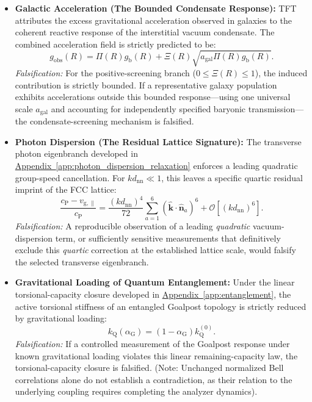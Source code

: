 \begin{itemize}
    \item \textbf{Galactic Acceleration (The Bounded Condensate Response):} TFT attributes the excess gravitational acceleration observed in galaxies to the coherent reactive response of the interstitial vacuum condensate. The combined acceleration field is strictly predicted to be:
    \begin{equation}
        g_{\mathrm{obs}}(R) = \Pi(R)g_{\mathrm b}(R) + \Xi(R) \sqrt{ a_{\mathrm{gal}}\Pi(R)g_{\mathrm b}(R) }.
    \end{equation}
    \textit{Falsification:} For the positive-screening branch ($0\leq\Xi(R)\leq1$), the induced contribution is strictly bounded. If a representative galaxy population exhibits accelerations outside this bounded response—using one universal scale $a_{\mathrm{gal}}$ and accounting for independently specified baryonic transmission—the condensate-screening mechanism is falsified.

    \item \textbf{Photon Dispersion (The Residual Lattice Signature):} The transverse photon eigenbranch developed in \hyperref[app:photon_dispersion_relaxation]{Appendix~\ref*{app:photon_dispersion_relaxation}} enforces a leading quadratic group-speed cancellation. For $kd_{\mathrm{nn}}\ll1$, this leaves a specific quartic residual imprint of the FCC lattice:
    \begin{equation}
        \frac{ c_{\mathrm P}-v_{\mathrm{g},\parallel} }{ c_{\mathrm P} } = \frac{(kd_{\mathrm{nn}})^4}{72} \sum_{a=1}^{6} \left( \widehat{\mathbf{k}}\cdot \widehat{\mathbf{n}}_a \right)^6 + \mathcal{O}\left[(kd_{\mathrm{nn}})^6\right].
    \end{equation}
    \textit{Falsification:} A reproducible observation of a leading \textit{quadratic} vacuum-dispersion term, or sufficiently sensitive measurements that definitively exclude this \textit{quartic} correction at the established lattice scale, would falsify the selected transverse eigenbranch.

    \item \textbf{Gravitational Loading of Quantum Entanglement:} Under the linear torsional-capacity closure developed in \hyperref[app:entanglement]{Appendix~\ref*{app:entanglement}}, the active torsional stiffness of an entangled Goalpost topology is strictly reduced by gravitational loading:
    \begin{equation}
        k_{\mathrm Q}(\alpha_{\mathrm G}) = (1-\alpha_{\mathrm G}) k_{\mathrm Q}^{(0)}.
    \end{equation}
    \textit{Falsification:} If a controlled measurement of the Goalpost response under known gravitational loading violates this linear remaining-capacity law, the torsional-capacity closure is falsified. (Note: Unchanged normalized Bell correlations alone do not establish a contradiction, as their relation to the underlying coupling requires completing the analyzer dynamics).


\end{itemize}
